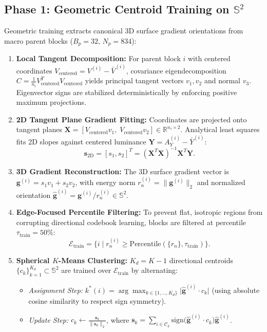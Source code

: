 \documentclass[11pt,a4paper]{article}
\begin{document}
\subsection{Phase 1: Geometric Centroid Training on $\mathbb{S}^2$}
Geometric training extracts canonical 3D surface gradient orientations from macro parent blocks ($B_p = 32$, $N_p = 834$):
\begin{enumerate}
  \item \textbf{Local Tangent Decomposition:} For parent block $i$ with centered coordinates $V_{\text{centered}} = V^{(i)} - \bar{V}^{(i)}$, covariance eigendecomposition $C = \frac{1}{n_i}V_{\text{centered}}^T V_{\text{centered}}$ yields principal tangent vectors $v_1, v_2$ and normal $v_3$. Eigenvector signs are stabilized deterministically by enforcing positive maximum projections.
  \item \textbf{2D Tangent Plane Gradient Fitting:} Coordinates are projected onto tangent planes $\mathbf{X} = [V_{\text{centered}} v_1, \; V_{\text{centered}} v_2] \in \mathbb{R}^{n_i \times 2}$. Analytical least squares fits 2D slopes against centered luminance $\mathbf{Y} = A_Y^{(i)} - \bar{Y}^{(i)}$:
  \begin{equation}
    \mathbf{s}_{\text{2D}} = [s_1, s_2]^T = (\mathbf{X}^T \mathbf{X})^{-1} \mathbf{X}^T \mathbf{Y}.
  \end{equation}
  \item \textbf{3D Gradient Reconstruction:} The 3D surface gradient vector is $\mathbf{g}^{(i)} = s_1 v_1 + s_2 v_2$, with energy norm $r_n^{(i)} = \|\mathbf{g}^{(i)}\|_2$ and normalized orientation $\hat{\mathbf{g}}^{(i)} = \mathbf{g}^{(i)} / r_n^{(i)} \in \mathbb{S}^2$.
  \item \textbf{Edge-Focused Percentile Filtering:} To prevent flat, isotropic regions from corrupting directional codebook learning, blocks are filtered at percentile $\tau_{\text{train}} = 50\%$:
  \begin{equation}
    \mathcal{E}_{\text{train}} = \{ i \mid r_n^{(i)} \ge \text{Percentile}(\{r_n\}, \tau_{\text{train}}) \}.
  \end{equation}
  \item \textbf{Spherical $K$-Means Clustering:} $K_d = K-1$ directional centroids $\{c_k\}_{k=1}^{K_d} \subset \mathbb{S}^2$ are trained over $\mathcal{E}_{\text{train}}$ by alternating:
  \begin{itemize}
    \item \emph{Assignment Step:} $k^*(i) = \arg\max_{k \in \{1,\dots,K_d\}} \big| \hat{\mathbf{g}}^{(i)} \cdot c_k \big|$ (using absolute cosine similarity to respect sign symmetry).
    \item \emph{Update Step:} $c_k \leftarrow \frac{\mathbf{s}_k}{\|\mathbf{s}_k\|_2}$, where $\mathbf{s}_k = \sum_{i \in \mathcal{C}_k} \text{sign}\big(\hat{\mathbf{g}}^{(i)} \cdot c_k\big) \hat{\mathbf{g}}^{(i)}$.
  \end{itemize}
\end{enumerate}
\end{document}
